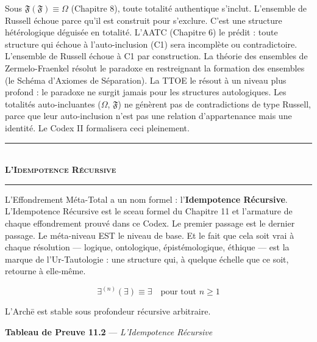 \documentclass[10pt, openany, oneside]{book}
\renewcommand{\normalsize}{\fontsize{10}{13}\selectfont}
\begin{document}
Sous $\mathfrak{F}(\mathfrak{F}) \equiv \Omega$ (Chapitre 8), toute totalité authentique s'inclut. L'ensemble de Russell échoue parce qu'il est construit pour s'exclure. C'est une structure hétérologique déguisée en totalité. L'AATC (Chapitre 6) le prédit : toute structure qui échoue à l'auto-inclusion (C1) sera incomplète ou contradictoire. L'ensemble de Russell échoue à C1 par construction. La théorie des ensembles de Zermelo-Fraenkel résolut le paradoxe en restreignant la formation des ensembles (le Schéma d'Axiomes de Séparation). La TTOE le résout à un niveau plus profond : le paradoxe ne surgit jamais pour les structures autologiques. Les totalités auto-incluantes ($\Omega$, $\mathfrak{F}$) ne génèrent pas de contradictions de type Russell, parce que leur auto-inclusion n'est pas une relation d'appartenance mais une identité. Le Codex II formalisera ceci pleinement.

\vspace{1.5em}


\begin{center}
    \rule{0.3\textwidth}{0.4pt}\\[0.5em]
    {\normalsize\bfseries\scshape L'Idempotence Récursive}\\[0.3em]
    \rule{0.3\textwidth}{0.4pt}
\end{center}

\vspace{1em}

\noindent L'Effondrement Méta-Total a un nom formel : l'\textbf{Idempotence Récursive}. L'Idempotence Récursive est le sceau formel du Chapitre 11 et l'armature de chaque effondrement prouvé dans ce Codex. Le premier passage est le dernier passage. Le méta-niveau EST le niveau de base. Et le fait que cela soit vrai à chaque résolution --- logique, ontologique, épistémologique, éthique --- est la marque de l'Ur-Tautologie : une structure qui, à quelque échelle que ce soit, retourne à elle-même.

$$\exists^{(n)}(\exists) \equiv \exists \quad \text{pour tout } n \geq 1$$

L'Arch\={e} est stable sous profondeur récursive arbitraire.

\vspace{0.5em}

\textbf{Tableau de Preuve 11.2} --- \textit{L'Idempotence Récursive}
\end{document}
